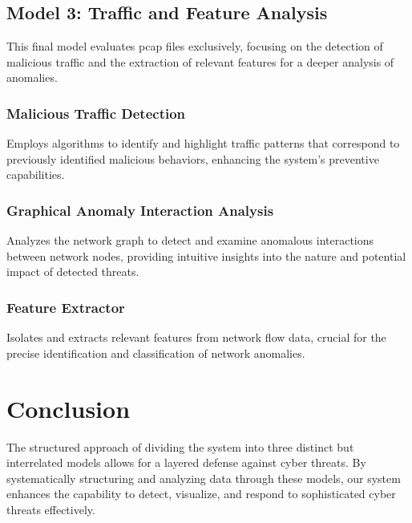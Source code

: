 \subsection{Model 3: Traffic and Feature Analysis}
This final model evaluates pcap files exclusively, focusing on the detection of malicious traffic and the extraction of relevant features for a deeper analysis of anomalies.

\subsubsection{Malicious Traffic Detection}
Employs algorithms to identify and highlight traffic patterns that correspond to previously identified malicious behaviors, enhancing the system's preventive capabilities.

\subsubsection{Graphical Anomaly Interaction Analysis}
Analyzes the network graph to detect and examine anomalous interactions between network nodes, providing intuitive insights into the nature and potential impact of detected threats.

\subsubsection{Feature Extractor}
Isolates and extracts relevant features from network flow data, crucial for the precise identification and classification of network anomalies.

\section{Conclusion}
The structured approach of dividing the system into three distinct but interrelated models allows for a layered defense against cyber threats. By systematically structuring and analyzing data through these models, our system enhances the capability to detect, visualize, and respond to sophisticated cyber threats effectively.
